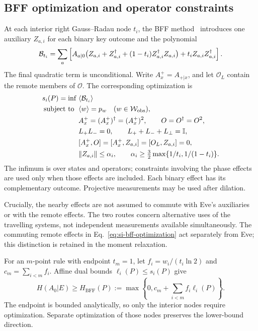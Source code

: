 \documentclass[aps,10pt,onecolumn,prx,superscriptaddress,longbibliography,nofootinbib]{revtex4-2}
\newcommand{\id}{\mathbb I}
\begin{document}
\subsection{BFF optimization and operator constraints}\label{app:model-inventory}

At each interior right Gauss--Radau node \(t_i\), the BFF method~\cite{Brown2021,Brown2024} introduces one auxiliary \(Z_{a,i}\) for each binary key outcome and the polynomial
\begin{equation}
 {\cal B}_{t_i}=\sum_a\left[
 A_{a|0}\bigl(Z_{a,i}+Z_{a,i}^\dagger
 +(1-t_i)Z_{a,i}^\dagger Z_{a,i}\bigr)
 +t_iZ_{a,i}Z_{a,i}^\dagger\right].
 \label{eq:si-bff-polynomial}
\end{equation}
The final quadratic term is unconditional. Write \(A_x^+=A_{+|x}\), and let \(\mathcal O_L\) contain the remote members of \(\mathcal O\). The corresponding optimization is
\begin{equation}
 \begin{aligned}
 s_i(P)=\inf\;&\langle{\cal B}_{t_i}\rangle\\
 \text{subject to }\;&
 \langle w\rangle=p_w\quad(w\in\mathcal W_{\mathrm{obs}}),\\
 &A_x^+=(A_x^+)^\dagger=(A_x^+)^2,\qquad O=O^\dagger=O^2,\\
 &L_+L_-=0,\qquad L_++L_-+L_\perp=\id,\\
 &[A_x^+,O]=[A_x^+,Z_{a,i}]=[O_L,Z_{a,i}]=0,\\
 &\|Z_{a,i}\|\leq\alpha_i,\qquad
 \alpha_i\geq\tfrac32\max\{1/t_i,1/(1-t_i)\}.
 \end{aligned}
 \label{eq:si-bff-optimization}
\end{equation}
The infimum is over states and operators; constraints involving the phase effects are used only when those effects are included. Each binary effect has its complementary outcome. Projective measurements may be used after dilation.

Crucially, the nearby effects are not assumed to commute with Eve's auxiliaries or with the remote effects. The two routes concern alternative uses of the travelling systems, not independent measurements available simultaneously. The commuting remote effects in Eq.~\eqref{eq:si-bff-optimization} act separately from Eve; this distinction is retained in the moment relaxation.

For an \(m\)-point rule with endpoint \(t_m=1\), let
\(f_i=w_i/(t_i\ln2)\) and \(c_m=\sum_{i<m}f_i\).
Affine dual bounds \(\ell_i(P)\leq s_i(P)\) give
\begin{equation}
 H(A_0|E)\geq H_{\mathrm{BFF}}(P)
 :=\max\left\{0,c_m+\sum_{i<m}f_i\ell_i(P)\right\}.
 \label{eq:si-bff-bridge}
\end{equation}
The endpoint is bounded analytically, so only the interior nodes require optimization. Separate optimization of those nodes preserves the lower-bound direction.
\end{document}
